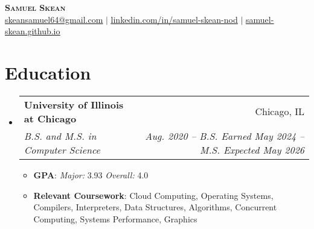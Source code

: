 \documentclass[letterpaper,11pt]{article}
\makeatletter
\newcommand{\resumeSubheading}[4]{
  \vspace{-2pt}\item
    \begin{tabular*}{0.97\textwidth}[t]{l@{\extracolsep{\fill}}r}
      \textbf{#1} & #2 \\
      \textit{\small#3} & \textit{\small #4} \\
    \end{tabular*}\vspace{-7pt}
}
\newcommand{\resumeSubHeadingListStart}{\begin{itemize}[leftmargin=0.15in, label={}]}
\newcommand{\resumeSubHeadingListEnd}{\end{itemize}}
\makeatother
\begin{document}

\begin{center}
    \textbf{\Huge \scshape Samuel Skean} \\ \vspace{1pt} \href{mailto:skeansamuel64@gmail.com}{\underline{skeansamuel64@gmail.com}} $|$ 
    \href{https://www.linkedin.com/in/samuel-skean-nod}{\underline{linkedin.com/in/samuel-skean-nod}} $|$ \href{https://samuel-skean.github.io}{\underline{samuel-skean.github.io}}
\end{center}


\section{Education}
  \resumeSubHeadingListStart
    \resumeSubheading
      {University of Illinois at Chicago}{Chicago, IL}
      {B.S. and M.S. in Computer Science}{Aug. 2020 -- B.S. Earned May 2024 -- M.S. Expected May 2026}
      \begin{itemize}
        \item \textbf{GPA}{: \emph{Major:} 3.93 \emph{Overall:} 4.0}
        \item \textbf{Relevant Coursework}: Cloud Computing, Operating Systems, Compilers, Interpreters, Data Structures, Algorithms, Concurrent Computing, Systems Performance, Graphics
      \end{itemize}
  \resumeSubHeadingListEnd
\end{document}
